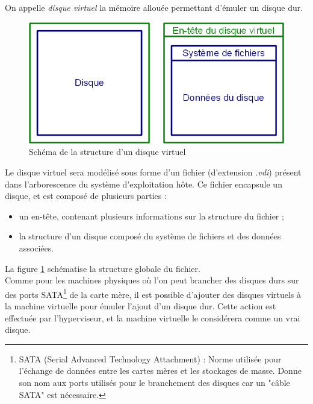 On appelle \textit{disque virtuel} la mémoire allouée permettant d'émuler un disque dur.

\begin{figure}[!h]
	\center
	\includegraphics[scale=0.5]{img/Disque_virtuel.png}
	\caption{Schéma de la structure d'un disque virtuel}
	\label{Schéma Disque virtuel}
\end{figure}

Le disque virtuel sera modélisé sous forme d'un fichier (d'extension \textit{.vdi}) présent dans l'arborescence du système d'exploitation hôte.
Ce fichier encapsule un disque, et est composé de plusieurs parties :
\begin{itemize}
	\item un en-tête, contenant plusieurs informations sur la structure du fichier ;
	\item la structure d'un disque composé du système de fichiers et des données associées.
\end{itemize}
La figure \ref{Schéma Disque virtuel} schématise la structure globale du fichier.
\\


Comme pour les machines physiques où l'on peut brancher des disques durs sur des ports SATA\footnote{SATA (Serial Advanced Technology Attachment) : Norme utilisée pour l'échange de données entre les cartes mères et les stockages de masse. Donne son nom aux ports utilisés pour le branchement des disques car un "câble SATA" est nécessaire.} de la carte mère, il est possible d'ajouter des disques virtuels à la machine virtuelle pour émuler l'ajout d'un disque dur.
Cette action est effectuée par l'hyperviseur, et la machine virtuelle le considérera comme un vrai disque.
\\




